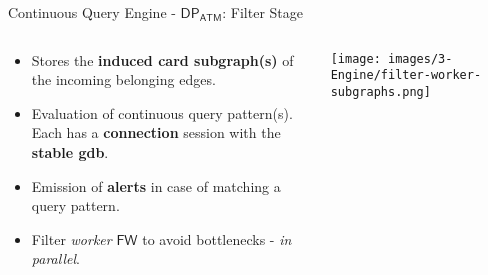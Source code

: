 \begin{comment}
        \node (down4) at (5.7, -2.55);
        \draw [[-{Stealth[length=4mm]}, visible on=<2->, alt=<2>{red}{black}] (4) to["log" '] (down4);
        
        \node (right4) at (7.4, 0);
        \draw [[-{Stealth[length=4mm]}, visible on=<2->, red] (4) to["Alerts"] (right4);
    \end{tikzpicture}
    \end{adjustwidth}
\end{frame}
\end{comment}

\begin{frame}{Continuous Query Engine - $\mathsf{DP_{ATM}}$: Filter Stage}
    \begin{columns} %
        \begin{column}{0.5\textwidth}
            \begin{itemize}
                \item Stores the \textbf{induced card subgraph(s)} of the incoming belonging edges.
                \item Evaluation of continuous query pattern(s). Each has a \textbf{connection} session with the \textbf{stable gdb}.
                \item Emission of \textbf{alerts} in case of matching a query pattern.
                \item Filter \emph{worker} $\mathsf{FW}$ to avoid bottlenecks - \emph{in parallel}.
            \end{itemize}
        \end{column}

        \begin{column}{0.6\textwidth}
            \centering
            \texttt{[image: images/3-Engine/filter-worker-subgraphs.png]}
        \end{column}
    \end{columns}
\end{frame}

